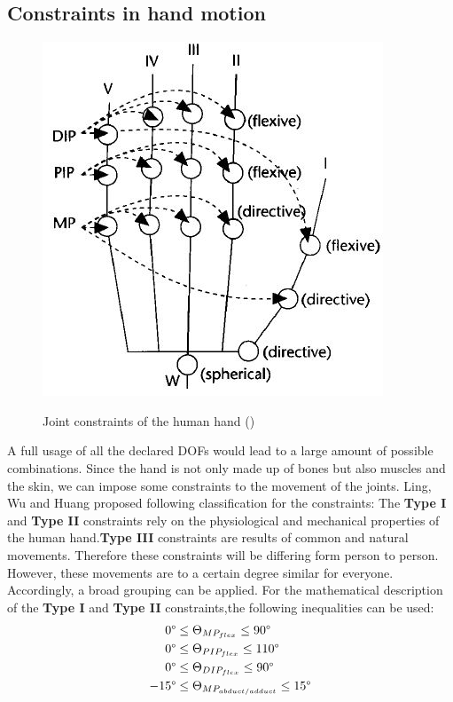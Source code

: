 \subsection{Constraints in hand motion}
\begin{figure}[ht]
\centering
	\includegraphics[width=\columnwidth/2]{images/HAND_DOFs.JPG}
	\label{Handstructure} 
	\caption{Joint constraints of the human hand (\cite{LEE.1995})}
\end{figure}
A full usage of all the declared DOFs would lead to a large amount of possible combinations. Since the hand is not only made up of bones but also muscles and the skin, we can impose some constraints \cite{Badler.1987,Pavlovic.1997} to the movement of the joints. Ling, Wu and Huang\cite{LIN.2000} proposed following classification for the constraints:
The \textbf{Type I} and \textbf{Type II} constraints rely on the physiological and mechanical properties of the human hand.\textbf{Type III} constraints are results of common and natural movements. Therefore these constraints will be differing form person to person. However, these movements are to a certain degree similar for everyone. Accordingly, a broad grouping can be applied. For the mathematical description of the \textbf{Type I} and \textbf{Type II} constraints,the following inequalities can be used:
\begin{equation}
\begin{split}
0\degree&\leq \Theta _{MP_{flex}} \leq 90\degree\\
0\degree&\leq \Theta _{PIP_{flex}} \leq 110\degree\\
0\degree&\leq \Theta _{DIP_{flex}} \leq 90\degree\\
-15\degree&\leq \Theta _{MP_{abduct/adduct}} \leq 15\degree
\end{split}
\end{equation}
